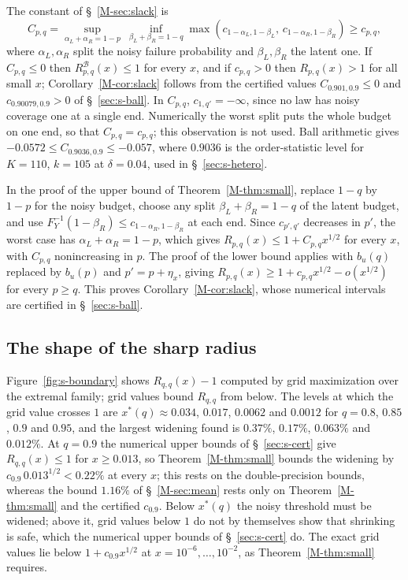 \documentclass[11pt]{article}
\renewcommand{\_}{\usc\allowbreak}
\begin{document}
The constant of \S~\ref{M-sec:slack} is
\begin{equation}\label{eq:C}
C_{p,q} = \sup_{\alpha_L + \alpha_R = 1 - p}\ \inf_{\beta_L + \beta_R = 1 - q} \max(c_{1-\alpha_L, 1-\beta_L},\, c_{1-\alpha_R, 1-\beta_R}) \ge c_{p,q},
\end{equation}
where $\alpha_L, \alpha_R$ split the noisy failure probability and $\beta_L, \beta_R$ the latent one. If $C_{p,q} \le 0$ then $R^{\mathcal B}_{p,q}(x) \le 1$ for every $x$, and if $c_{p,q} > 0$ then $R_{p,q}(x) > 1$ for all small $x$; Corollary~\ref{M-cor:slack} follows from the certified values $C_{0.901,0.9} \le 0$ and $c_{0.90079,0.9} > 0$ of \S~\ref{sec:s-ball}. In $C_{p,q}$, $c_{1,q'} = -\infty$, since no law has noisy coverage one at a single end. Numerically the worst split puts the whole budget on one end, so that $C_{p,q} = c_{p,q}$; this observation is not used. Ball arithmetic gives $-0.0572 \le C_{0.9036,0.9} \le -0.057$, where $0.9036$ is the order-statistic level for $K = 110$, $k = 105$ at $\delta = 0.04$, used in \S~\ref{sec:s-hetero}.

In the proof of the upper bound of Theorem~\ref{M-thm:small}, replace $1 - q$ by $1 - p$ for the noisy budget, choose any split $\beta_L + \beta_R = 1 - q$ of the latent budget, and use $F_Y^{-1}(1-\beta_R) \le c_{1-\alpha_R, 1-\beta_R}$ at each end. Since $c_{p',q'}$ decreases in $p'$, the worst case has $\alpha_L + \alpha_R = 1 - p$, which gives $R_{p,q}(x) \le 1 + C_{p,q}x^{1/2}$ for every $x$, with $C_{p,q}$ nonincreasing in $p$. The proof of the lower bound applies with $b_u(q)$ replaced by $b_u(p)$ and $p' = p + \eta_x$, giving $R_{p,q}(x) \ge 1 + c_{p,q}x^{1/2} - o(x^{1/2})$ for every $p \ge q$. This proves Corollary~\ref{M-cor:slack}, whose numerical intervals are certified in \S~\ref{sec:s-ball}.

\subsection*{The shape of the sharp radius}\label{sec:s-shape}

Figure~\ref{fig:s-boundary} shows $R_{q,q}(x) - 1$ computed by grid maximization over the extremal family; grid values bound $R_{q,q}$ from below. The levels at which the grid value crosses $1$ are $x^*(q) \approx 0.034$, $0.017$, $0.0062$ and $0.0012$ for $q = 0.8$, $0.85$, $0.9$ and $0.95$, and the largest widening found is $0.37\%$, $0.17\%$, $0.063\%$ and $0.012\%$. At $q = 0.9$ the numerical upper bounds of \S~\ref{sec:s-cert} give $R_{q,q}(x) \le 1$ for $x \ge 0.013$, so Theorem~\ref{M-thm:small} bounds the widening by $c_{0.9}\,0.013^{1/2} < 0.22\%$ at every $x$; this rests on the double-precision bounds, whereas the bound $1.16\%$ of \S~\ref{M-sec:mean} rests only on Theorem~\ref{M-thm:small} and the certified $c_{0.9}$. Below $x^*(q)$ the noisy threshold must be widened; above it, grid values below $1$ do not by themselves show that shrinking is safe, which the numerical upper bounds of \S~\ref{sec:s-cert} do. The exact grid values lie below $1 + c_{0.9}x^{1/2}$ at $x = 10^{-6}, \ldots, 10^{-2}$, as Theorem~\ref{M-thm:small} requires.
\end{document}
